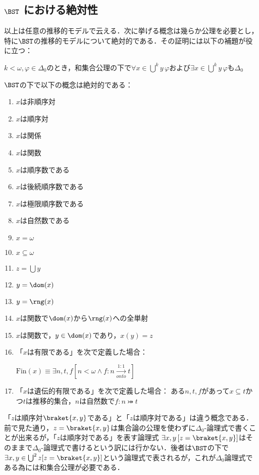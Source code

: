 \documentclass[a4j]{ltjsarticle}
\begin{document}
\subsection{$\BST$ における絶対性}
以上は任意の推移的モデルで云える．次に挙げる概念は幾らか公理を必要とし，特に$\BST$の推移的モデルについて絶対的である．その証明には以下の補題が役に立つ：

\begin{lemma}
 $k < \omega, \varphi \in \Delta_0$のとき，和集合公理の下で$\forall x \in \bigcup^k y\,\varphi$および$\exists x \in \bigcup^k y\,\varphi$も$\Delta_0$
\end{lemma}

\begin{theorem}
 $\BST$の下で以下の概念は絶対的である：

  \begin{enumerate}
   \item $x$は非順序対
   \item $x$は順序対
   \item $x$は関係
   \item $x$は関数
   \item $x$は順序数である
   \item $x$は後続順序数である
   \item $x$は極限順序数である
   \item $x$は自然数である
   \item $x = \omega$
   \item $x \subseteq \omega$
   \item $z = \bigcup y$
   \item $y = \dom(x)$
   \item $y = \rng(x)$
   \item $x$は関数で$\dom(x)$から$\rng(x)$への全単射
   \item $x$は関数で，$y \in \dom(x)$であり，$x(y) = z$
   \item 「$x$は有限である」を次で定義した場合：

	 $\mathrm{Fin}(x) \equiv \exists n, t, f [ n < \omega \wedge f: n \xrightarrow[onto]{1:1} t]$
   \item 「$x$は遺伝的有限である」を次で定義した場合：
	 ある$n,t,f$があって$x \subseteq t$かつ$t$は推移的集合，$n$は自然数で$f : n \bij t$
  \end{enumerate}
\end{theorem}

\begin{remark}
 「$z$は順序対$\braket{x,y}$である」と「$z$は順序対である」は違う概念である．前で見た通り，$z = \braket{x,y}$は集合論の公理を使わずに$\Delta_0$-論理式で書くことが出来るが，「$z$は順序対である」を表す論理式 $\exists x, y \, [z = \braket{x, y}]$はそのままで$\Delta_0$-論理式で書けるという訳には行かない．後者は$\BST$の下で$\exists x, y \in \bigcup^2 z [z = \braket{x, y}]$という論理式で表されるが，これが$\Delta_0$論理式である為には和集合公理が必要である．
\end{remark}
\end{document}
